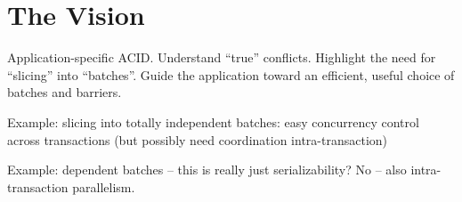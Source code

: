 \documentclass{sig-alternate}
\begin{document}
\section{The Vision}
Application-specific ACID.  Understand ``true'' conflicts.  Highlight the need
for ``slicing'' into ``batches''.  Guide the application toward an efficient,
useful choice of batches and barriers.

Example: slicing into totally independent batches: easy concurrency control
across transactions (but possibly need coordination intra-transaction)

Example: dependent batches -- this is really just serializability?  No -- also
intra-transaction parallelism.


\end{document}

